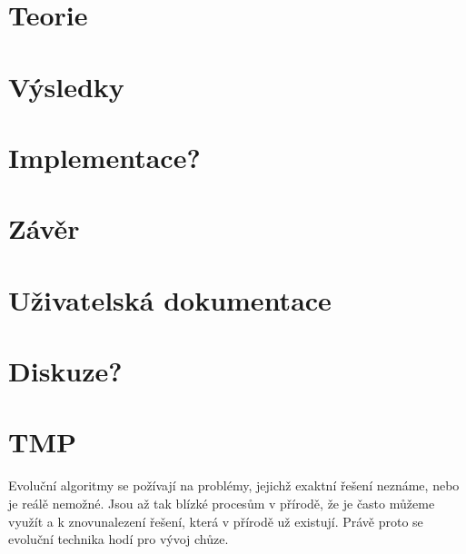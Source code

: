 \documentclass[a4]{article}
\begin{document}
\section{Teorie} 
\section{Výsledky} 
\section{Implementace?}%
\section{Závěr} 
\section{Uživatelská dokumentace} 
\section{Diskuze?} 
\section{TMP}
Evoluční algoritmy se požívají na problémy, jejichž exaktní řešení neznáme, nebo je reálě nemožné. Jsou až tak blízké procesům v přírodě, že je často můžeme využít a k znovunalezení řešení, která v přírodě už existují. Právě proto se evoluční technika hodí pro vývoj chůze.
\end{document}
